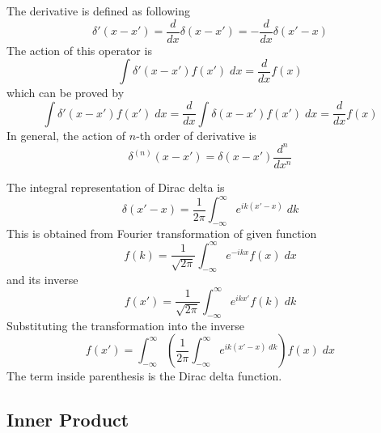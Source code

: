 \documentclass[../main.tex]{subfiles}
\begin{document}
The derivative is defined as following 
\begin{equation*}
	\delta'(x-x')=\frac{d }{dx}\delta(x-x')=-\frac{d }{dx}\delta(x'-x)
\end{equation*}
The action of this operator is 
\begin{equation*}
	\int\delta'(x-x')f(x')\;dx=\frac{d }{dx} f(x)
\end{equation*}
which can be proved by 
\begin{equation*}
	\int\delta'(x-x')f(x')\;dx=\frac{d }{dx }\int\delta(x-x')f(x')\;dx=\frac{d }{dx}f(x)
\end{equation*}
In general, the action of $n$-th order of derivative is 
\begin{equation*}
	\delta^{(n)}(x-x')=\delta(x-x')\frac{d^n }{dx^n}
\end{equation*}

The integral representation of Dirac delta is 
\begin{equation*}
	\delta(x'-x)=\frac{1 }{2\pi} \int_{-\infty}^{\infty} e^{ik(x'-x)}\;dk
\end{equation*}
This is obtained from Fourier transformation of given function
\begin{equation*}
	f(k)=\frac{1 }{\sqrt{2\pi }}\int_{-\infty}^{\infty} e^{-ikx}f(x)\;dx
\end{equation*}
and its inverse
\begin{equation*}
	f(x')=\frac{1 }{\sqrt{2\pi }}\int_{-\infty}^{\infty} e^{ikx'}f(k)\;dk
\end{equation*}
Substituting the transformation into the inverse
\begin{equation*}
	f(x')=\int_{-\infty}^{\infty} \left(\frac{1 }{2\pi}\int_{-\infty}^{\infty} e^{ik(x'-x)\;dk}\right)f(x)\;dx
\end{equation*}
The term inside parenthesis is the Dirac delta function.

\subsection*{Inner Product}
\end{document}
